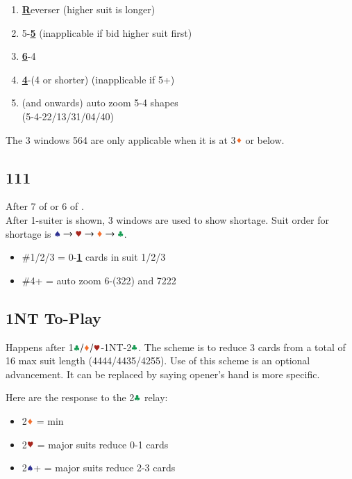 \documentclass{article}
\newcommand*{\ccc}{\textcolor{ForestGreen}{\clubsuit}}
\newcommand*{\ddd}{\textcolor{Orange}{\vardiamondsuit}}
\newcommand*{\hhh}{\textcolor{Mahogany}{\varheartsuit}}
\newcommand*{\sss}{\textcolor{Blue}{\spadesuit}}
\begin{document}
\begin{multicols}{2}
\begin{enumerate}
    \setlength\itemsep{-0.2em}
    \item \textbf{\underline{R}}everser (higher suit is longer)
    \item 5-\textbf{\underline{5}} (inapplicable if bid higher suit first)
    \item \textbf{\underline{6}}-4
    \item \textbf{\underline{4}}-(4 or shorter) (inapplicable if 5+)
    \item (and onwards) auto zoom 5-4 shapes \\
        (5-4-22/13/31/04/40)
\end{enumerate}

\noindent The 3 windows 564 are only applicable when it is at 3$\ddd$ or below.

\subsection{111}\label{sec:111}
After 7 of  or 6 of . \\
After 1-suiter is shown, 3 windows are used to show shortage. Suit order for shortage is $\sss \rightarrow \hhh \rightarrow \ddd \rightarrow \ccc$.

\begin{itemize}
    \setlength\itemsep{-0.2em}
    \item \#1/2/3 = 0-\textbf{\underline{1}} cards in suit 1/2/3
    \item \#4+ = auto zoom 6-(322) and 7222
\end{itemize}

\subsection{1NT To-Play}\label{sec:1nt-to-play}
Happens after 1$\ccc/\ddd/\hhh$-1NT-2$\ccc$. The scheme is to reduce 3 cards from a total of 16 max suit length (4444/4435/4255). Use of this scheme is an optional advancement. It can be replaced by saying opener's hand is more specific.

\columnbreak

\noindent Here are the response to the 2$\ccc$ relay:
\begin{itemize}
    \setlength\itemsep{-0.2em}
    \item 2$\ddd$ = min
    \item 2$\hhh$ = major suits reduce 0-1 cards
    \item 2$\sss$+ = major suits reduce 2-3 cards
\end{itemize}


\end{multicols}
\end{document}
